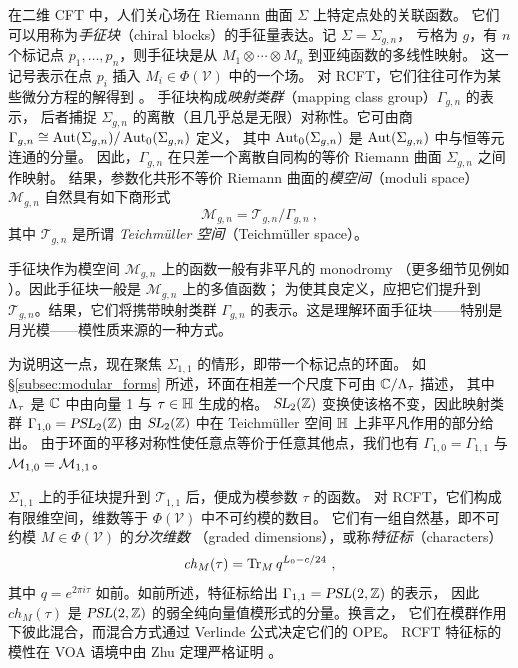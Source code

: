 在二维 CFT 中，人们关心场在 Riemann 曲面 $\Sigma$ 上特定点处的关联函数。
它们可以用称为\emph{手征块}（chiral blocks）的手征量表达。记 $\Sigma=\Sigma_{g,n}$，
亏格为 $g$，有 $n$ 个标记点 $p_1,\dots,p_n$，则手征块是从
$M_1 \otimes\cdots\otimes M_n$ 到亚纯函数的多线性映射。
这一记号表示在点 $p_i$ 插入 $M_i\in\Phi(\mathcal{V})$ 中的一个场。
对 RCFT，它们往往可作为某些微分方程的解得到
\cite{FelderGiovanni1996TKeo,FuchsJürgen1992ALaa,KohnoToshitake2002Cfta}。
手征块构成\emph{映射类群}（mapping class group）$\Gamma_{g,n}$ 的表示，
后者捕捉 $\Sigma_{g,n}$ 的离散（且几乎总是无限）对称性。它可由商
$\Gamma_{g,n}\cong\operatorname{\text{Aut}}(\Sigma_{g,n})/\operatorname{\text{Aut}}_0(\Sigma_{g,n})$ 定义，
其中 $\operatorname{\text{Aut}}_0(\Sigma_{g,n})$ 是 $\operatorname{\text{Aut}}(\Sigma_{g,n})$ 中与恒等元连通的分量。
因此，$\Gamma_{g,n}$ 在只差一个离散自同构的等价 Riemann 曲面 $\Sigma_{g,n}$ 之间作映射。
结果，参数化共形不等价 Riemann 曲面的\emph{模空间}（moduli space）
$\mathcal{M}_{g,n}$ 自然具有如下商形式
\begin{equation}
\label{eq:moduli_space}
\mathcal{M}_{g,n}=\mathcal{T}_{g,n}/\Gamma_{g,n}~,
\end{equation} 其中 $\mathcal{T}_{g,n}$ 是所谓 \emph{Teichm\"uller 空间}（Teichmüller space）。

手征块作为模空间 $\mathcal{M}_{g,n}$ 上的函数一般有非平凡的 monodromy
（更多细节见例如 \cite{MR2201600}）。因此手征块一般是 $\mathcal{M}_{g,n}$ 上的多值函数；
为使其良定义，应把它们提升到 $\mathcal{T}_{g,n}$。结果，它们将携带映射类群
$\Gamma_{g,n}$ 的表示。这是理解环面手征块——特别是月光模——模性质来源的一种方式。

为说明这一点，现在聚焦 $\Sigma_{1,1}$ 的情形，即带一个标记点的环面。
如 \S\ref{subsec:modular_forms} 所述，环面在相差一个尺度下可由 $\mathbb{C}/\Lambda_\tau$ 描述，
其中 $\Lambda_\tau$ 是 $\mathbb{C}$ 中由向量 1 与 $\tau\in \mathbb{H}$ 生成的格。
$\operatorname{\textsl{SL}}_2(\mathbb{Z})$ 变换使该格不变，因此映射类群 $\Gamma_{1,0} = \operatorname{\textsl{PSL}}_2(\mathbb{Z})$
由 $\operatorname{\textsl{SL}}_2(\mathbb{Z})$ 中在 Teichm\"uller 空间 $\mathbb{H}$ 上非平凡作用的部分给出。
由于环面的平移对称性使任意点等价于任意其他点，我们也有
$\Gamma_{1,0}=\Gamma_{1,1}$ 与 ${\cal M}_{1,0} = {\cal M}_{1,1}$。

$\Sigma_{1,1}$ 上的手征块提升到 $\mathcal{T}_{1,1}$ 后，便成为模参数 $\tau$ 的函数。
对 RCFT，它们构成有限维空间，维数等于 $\Phi(\mathcal{V})$ 中不可约模的数目。
它们有一组自然基，即不可约模 $M\in\Phi(\mathcal{V})$ 的\emph{分次维数}
（graded dimensions），或称\emph{特征标}（characters）
\begin{equation}
\label{eq:character}
{\it ch}_M(\tau)=\operatorname{Tr}_{M} q^{L_0-c/24} ~, 
\end{equation}
其中 $q=e^{2\pi i\tau}$ 如前。如前所述，特征标给出 $\Gamma_{1,1}=\operatorname{\textsl{PSL}}(2,\mathbb{Z})$ 的表示，
因此 $ch_M(\tau)$ 是 $\operatorname{\textsl{PSL}}(2,\mathbb{Z})$ 的弱全纯向量值模形式的分量。换言之，
它们在模群作用下彼此混合，而混合方式通过 Verlinde 公式决定它们的 OPE。
RCFT 特征标的模性在 VOA 语境中由 Zhu 定理严格证明 \cite{Zhu_ModInv}。

